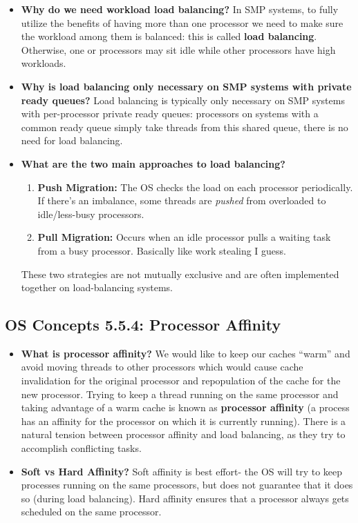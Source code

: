 \documentclass[12pt]{article}
\begin{document}
\begin{itemize}
    \item \textbf{Why do we need workload load balancing?} In SMP systems, to fully utilize the benefits of having more than one processor we need to make sure the workload among them is balanced: this is called \textbf{load balancing}. Otherwise, one or processors may sit idle while other processors have high workloads.
    \item \textbf{Why is load balancing only necessary on SMP systems with private ready queues?} Load balancing is typically only necessary on SMP systems with per-processor private ready queues: processors on systems with a common ready queue simply take threads from this shared queue, there is no need for load balancing.
    \item \textbf{What are the two main approaches to load balancing?}
        \begin{enumerate}
            \item \textbf{Push Migration:} The OS checks the load on each processor periodically. If there's an imbalance, some threads are \textit{pushed} from overloaded to idle/less-busy processors.
            \item \textbf{Pull Migration:} Occurs when an idle processor pulls a waiting task from a busy processor. Basically like work stealing I guess.
        \end{enumerate}
        These two strategies are not mutually exclusive and are often implemented together on load-balancing systems.
\end{itemize}

\subsection*{OS Concepts 5.5.4: Processor Affinity}

\begin{itemize}
    \item \textbf{What is processor affinity?} We would like to keep our caches ``warm'' and avoid moving threads to other processors which would cause cache invalidation for the original processor and repopulation of the cache for the new processor. Trying to keep a thread running on the same processor and taking advantage of a warm cache is known as \textbf{processor affinity} (a process has an affinity for the processor on which it is currently running). There is a natural tension between processor affinity and load balancing, as they try to accomplish conflicting tasks.
    \item \textbf{Soft vs Hard Affinity?} Soft affinity is best effort- the OS will try to keep processes running on the same processors, but does not guarantee that it does so (during load balancing). Hard affinity ensures that a processor always gets scheduled on the same processor.
\end{itemize}
\end{document}
